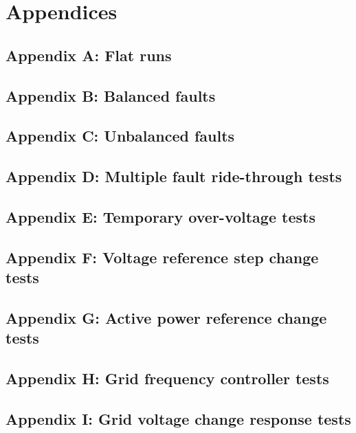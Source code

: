 \documentclass{../grid-link-report}
\newcommand{\projectassetsdir}{../project-assets}
\begin{document}
	
	
	
	
	
	\chapter{Appendices}
	\section{Appendix A: Flat runs}
	\label{Appendix A: Flat runs}
	\section{Appendix B: Balanced faults}
	\label{Appendix B: Balanced faults}
	\section{Appendix C: Unbalanced faults}
	\label{Appendix C: Unbalanced faults}
	\section{Appendix D: Multiple fault ride-through tests}
	\label{Appendix D: Multiple fault ride-through tests}
	\section{Appendix E: Temporary over-voltage tests}
	\label{Appendix E: Temporary over-voltage tests}
	\section{Appendix F: Voltage reference step change tests}
	\label{Appendix F: Voltage reference step change tests}
	\section{Appendix G: Active power reference change tests}
	\label{Appendix G: Active power reference change tests}
	\section{Appendix H: Grid frequency controller tests}
	\label{Appendix H: Grid frequency controller tests}
	\section{Appendix I: Grid voltage change response tests}
	\label{Appendix I: Grid voltage change response tests}
\end{document}
